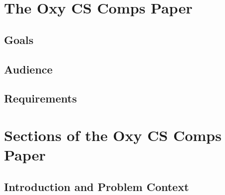 \documentclass[10pt,twocolumn]{article}
\begin{document}

\section{The Oxy CS Comps Paper}

\subsection{Goals}

\subsection{Audience}

\subsection{Requirements}

\section{Sections of the Oxy CS Comps Paper}

\subsection{Introduction and Problem Context}
\end{document}
